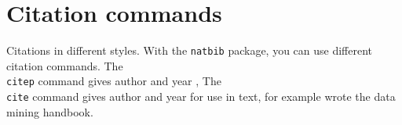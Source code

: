 \documentclass[11pt,a4paper,twoside]{article}
\begin{document}
\section{Citation commands}

Citations in different styles. With the \texttt{natbib} package, 
you can use different
citation commands. 
The \texttt{\\citep} command gives author and year \citep{mi:handbook03},
The \texttt{\\cite} command gives author and year for use in text, 
for example \cite{mi:handbook03} wrote the data mining handbook.   



%



\end{document}
